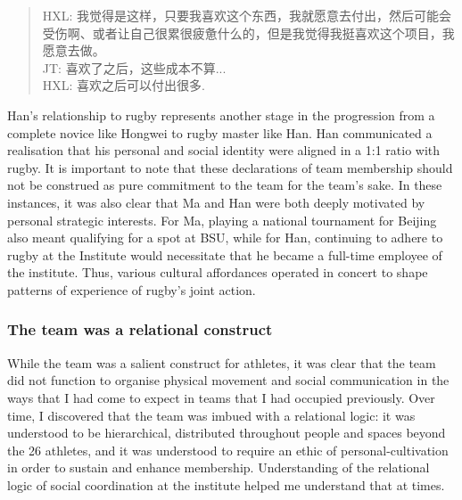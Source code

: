\begin{CJK}{UTF8}{gbsn}
          \begin{quote}
            HXL: 我觉得是这样，只要我喜欢这个东西，我就愿意去付出，然后可能会受伤啊、或者让自己很累很疲惫什么的，但是我觉得我挺喜欢这个项目，我愿意去做。\\
            JT: 喜欢了之后，这些成本不算...\\
            HXL: 喜欢之后可以付出很多.
          \end{quote}
Han's relationship to rugby represents another stage in the progression from a complete novice like Hongwei to rugby master like Han.  Han communicated a realisation that his personal and social identity were aligned in a 1:1 ratio with rugby.  It is important to note that these declarations of team membership should not be construed as pure commitment to the team for the team's sake.  In these instances, it was also clear that Ma and Han were both deeply motivated by personal strategic interests.  For Ma, playing a national tournament for Beijing also meant qualifying for a spot at BSU, while for Han, continuing to adhere to rugby at the Institute would necessitate that he became a full-time employee of the institute.  Thus, various cultural affordances operated in concert to shape patterns of experience of rugby's joint action.



\subsubsection{The team was a relational construct}
While the team was a salient construct for athletes, it was clear that the team did not function to organise physical movement and social communication in the ways that I had come to expect in teams that I had occupied previously.  Over time, I discovered that the team was imbued with a relational logic: it was understood to be hierarchical, distributed throughout people and spaces beyond the 26 athletes, and it was understood to require an ethic of personal-cultivation in order to sustain and enhance membership.  Understanding of the relational logic of social coordination at the institute helped me understand that at times.


\end{CJK}
